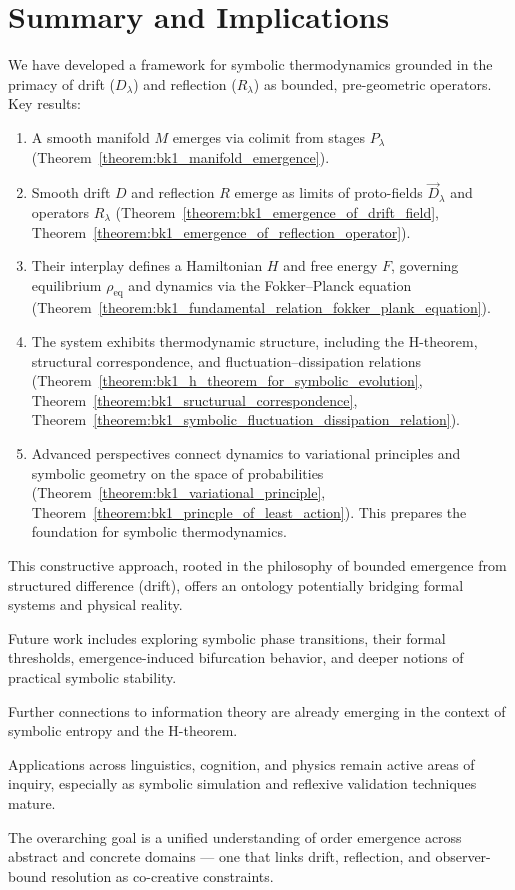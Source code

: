 \section{Summary and Implications}
\label{sec:bk1_summary_and_implications}
We have developed a framework for symbolic thermodynamics grounded in the primacy of drift ($D_\lambda$) and reflection ($R_\lambda$) as bounded, pre-geometric operators. Key results:
\begin{enumerate}
    \item A smooth manifold \( M \) emerges via colimit from stages \( P_\lambda \) (Theorem~\ref{theorem:bk1_manifold_emergence}).

    \item Smooth drift \( D \) and reflection \( R \) emerge as limits of proto-fields \( \vec{D}_\lambda \) and operators \( R_\lambda \) (Theorem~\ref{theorem:bk1_emergence_of_drift_field}, Theorem~\ref{theorem:bk1_emergence_of_reflection_operator}).

    \item Their interplay defines a Hamiltonian \( H \) and free energy \( F \), governing equilibrium \( \rho_{\text{eq}} \) and dynamics via the Fokker–Planck equation (Theorem~\ref{theorem:bk1_fundamental_relation_fokker_plank_equation}).

    \item The system exhibits thermodynamic structure, including the H-theorem, structural correspondence, and fluctuation–dissipation relations (Theorem~\ref{theorem:bk1_h_theorem_for_symbolic_evolution}, Theorem~\ref{theorem:bk1_sructurual_correspondence}, Theorem~\ref{theorem:bk1_symbolic_fluctuation_dissipation_relation}).

    \item Advanced perspectives connect dynamics to variational principles and symbolic geometry on the space of probabilities (Theorem~\ref{theorem:bk1_variational_principle}, Theorem~\ref{theorem:bk1_princple_of_least_action}). This prepares the foundation for symbolic thermodynamics.
\end{enumerate}
This constructive approach, rooted in the philosophy of bounded emergence from structured difference (drift), offers an ontology potentially bridging formal systems and physical reality.

Future work includes exploring symbolic phase transitions, their formal thresholds, emergence-induced bifurcation behavior, and deeper notions of practical symbolic stability.

Further connections to information theory are already emerging in the context of symbolic entropy and the H-theorem.

Applications across linguistics, cognition, and physics remain active areas of inquiry, especially as symbolic simulation and reflexive validation techniques mature.

The overarching goal is a unified understanding of order emergence across abstract and concrete domains — one that links drift, reflection, and observer-bound resolution as co-creative constraints.


